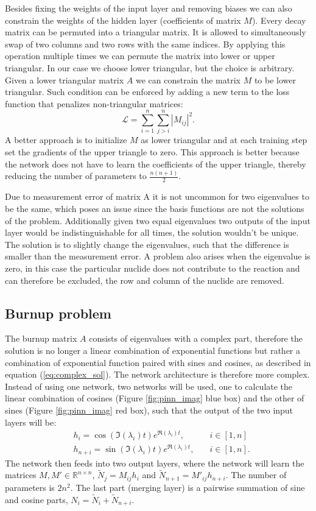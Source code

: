 \documentclass[10pt]{article}
\begin{document}
Besides fixing the weights of the input layer and removing biases we can also constrain the weights of the hidden layer (coefficients of matrix $M$). Every decay matrix can be permuted into a triangular matrix. It is allowed to simultaneously swap of two columns and two rows with the same indices. By applying this operation multiple times we can permute the matrix into lower or upper triangular. In our case we choose lower triangular, but the choice is arbitrary. Given a lower triangular matrix $A$ we can constrain the matrix $M$ to be lower triangular. Such condition can be enforced by adding a new term to the loss function that penalizes non-triangular matrices:
\begin{equation*}
    \mathcal{L} = \sum_{i=1}^n\sum_{j>i}^n |M_{ij}|^2.
\end{equation*}
A better approach is to initialize $M$ as lower triangular and at each training step set the gradients of the upper triangle to zero. This approach is better because the network does not have to learn the coefficients of the upper triangle, thereby reducing the number of parameters to $\frac{n(n+1)}{2}$.

Due to measurement error of matrix A it is not uncommon for two eigenvalues to be the same, which poses an issue since the basis functions are not the solutions of the problem. Additionally given two equal eigenvalues two outputs of the input layer would be indistinguishable for all times, the solution wouldn't be unique. The solution is to slightly change the eigenvalues, such that the difference is smaller than the measurement error. A problem also arises when the eigenvalue is zero, in this case the particular nuclide does not contribute to the reaction and can therefore be excluded, the row and column of the nuclide are removed.


\subsection{Burnup problem}
The burnup matrix $A$ consists of eigenvalues with a complex part, therefore the solution is no longer a linear combination of exponential functions but rather a combination of exponential function paired with sines and cosines, as described in equation (\ref{eq:complex_sol}). The network architecture is therefore more complex. Instead of using one network, two networks will be used, one to calculate the linear combination of cosines (Figure \ref{fig:pinn_imag} blue box) and the other of sines (Figure \ref{fig:pinn_imag} red box), such that the output of the two input layers will be:
\begin{align*}
    &h_i = \cos(\Im(\lambda_i) t) e^{\Re(\lambda_i) t},\quad&i \in [1,n]\label{eq:cosine}\\
    &h_{n+i} = \sin(\Im(\lambda_i) t) e^{\Re(\lambda_i) t},\quad&i \in [1,n]\label{eq:sine}.
\end{align*}
The network then feeds into two output layers, where the network will learn the matrices $M, M' \in \mathbb{R}^{n\times n}$, $\tilde{N}_j = M_{ij} h_i$ and $\tilde{N}_{n+1} = M'_{ij} h_{n+i}$. The number of parameters is $2n^2$. The last part (merging layer) is a pairwise summation of sine and cosine parts, $N_i = \tilde{N}_i + \tilde{N}_{n+i}$.
\end{document}
